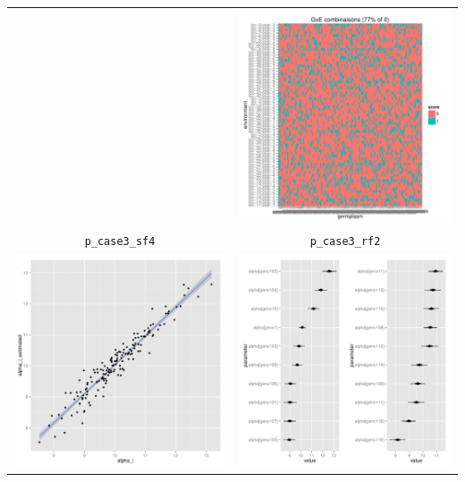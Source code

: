 \documentclass{book}\usepackage[]{graphicx}\usepackage[]{color}
\newenvironment{knitrout}{}{} %
\begin{document}
\begin{center}
\begin{tabular}{cc}
\begin{knitrout}
{}



\end{knitrout}
&
\begin{knitrout}
\definecolor{shadecolor}{rgb}{0.969, 0.969, 0.969}\color{fgcolor}

{\centering \includegraphics[width=.4\textwidth]{figures/PPBstats_unnamed-chunk-36-1} 

}



\end{knitrout}
\\
\texttt{p\_case3\_sf4} & \texttt{p\_case3\_rf2} \\
\begin{knitrout}
\definecolor{shadecolor}{rgb}{0.969, 0.969, 0.969}\color{fgcolor}

{\centering \includegraphics[width=.4\textwidth]{figures/PPBstats_unnamed-chunk-37-1} 

}



\end{knitrout}
&
\begin{knitrout}
\definecolor{shadecolor}{rgb}{0.969, 0.969, 0.969}\color{fgcolor}

{\centering \includegraphics[width=.4\textwidth]{figures/PPBstats_unnamed-chunk-38-1} 

}
\end{knitrout}
\end{tabular}
\end{center}
\end{document}
